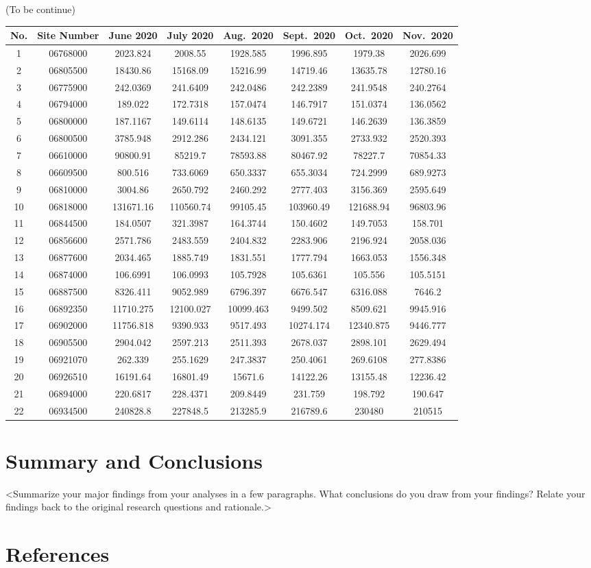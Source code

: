\documentclass[12pt,]{article}
\begin{document}
(To be continue)

\begin{longtable}[]{@{}cccccccc@{}}
\toprule
No. & Site Number & June 2020 & July 2020 & Aug.~2020 & Sept.~2020 &
Oct.~2020 & Nov.~2020\tabularnewline
\midrule
\endhead
1 & 06768000 & 2023.824 & 2008.55 & 1928.585 & 1996.895 & 1979.38 &
2026.699\tabularnewline
2 & 06805500 & 18430.86 & 15168.09 & 15216.99 & 14719.46 & 13635.78 &
12780.16\tabularnewline
3 & 06775900 & 242.0369 & 241.6409 & 242.0486 & 242.2389 & 241.9548 &
240.2764\tabularnewline
4 & 06794000 & 189.022 & 172.7318 & 157.0474 & 146.7917 & 151.0374 &
136.0562\tabularnewline
5 & 06800000 & 187.1167 & 149.6114 & 148.6135 & 149.6721 & 146.2639 &
136.3859\tabularnewline
6 & 06800500 & 3785.948 & 2912.286 & 2434.121 & 3091.355 & 2733.932 &
2520.393\tabularnewline
7 & 06610000 & 90800.91 & 85219.7 & 78593.88 & 80467.92 & 78227.7 &
70854.33\tabularnewline
8 & 06609500 & 800.516 & 733.6069 & 650.3337 & 655.3034 & 724.2999 &
689.9273\tabularnewline
9 & 06810000 & 3004.86 & 2650.792 & 2460.292 & 2777.403 & 3156.369 &
2595.649\tabularnewline
10 & 06818000 & 131671.16 & 110560.74 & 99105.45 & 103960.49 & 121688.94
& 96803.96\tabularnewline
11 & 06844500 & 184.0507 & 321.3987 & 164.3744 & 150.4602 & 149.7053 &
158.701\tabularnewline
12 & 06856600 & 2571.786 & 2483.559 & 2404.832 & 2283.906 & 2196.924 &
2058.036\tabularnewline
13 & 06877600 & 2034.465 & 1885.749 & 1831.551 & 1777.794 & 1663.053 &
1556.348\tabularnewline
14 & 06874000 & 106.6991 & 106.0993 & 105.7928 & 105.6361 & 105.556 &
105.5151\tabularnewline
15 & 06887500 & 8326.411 & 9052.989 & 6796.397 & 6676.547 & 6316.088 &
7646.2\tabularnewline
16 & 06892350 & 11710.275 & 12100.027 & 10099.463 & 9499.502 & 8509.621
& 9945.916\tabularnewline
17 & 06902000 & 11756.818 & 9390.933 & 9517.493 & 10274.174 & 12340.875
& 9446.777\tabularnewline
18 & 06905500 & 2904.042 & 2597.213 & 2511.393 & 2678.037 & 2898.101 &
2629.494\tabularnewline
19 & 06921070 & 262.339 & 255.1629 & 247.3837 & 250.4061 & 269.6108 &
277.8386\tabularnewline
20 & 06926510 & 16191.64 & 16801.49 & 15671.6 & 14122.26 & 13155.48 &
12236.42\tabularnewline
21 & 06894000 & 220.6817 & 228.4371 & 209.8449 & 231.759 & 198.792 &
190.647\tabularnewline
22 & 06934500 & 240828.8 & 227848.5 & 213285.9 & 216789.6 & 230480 &
210515\tabularnewline
\bottomrule
\end{longtable}

\newpage

\hypertarget{summary-and-conclusions}{%
\section{Summary and Conclusions}\label{summary-and-conclusions}}

\textless{}Summarize your major findings from your analyses in a few
paragraphs. What conclusions do you draw from your findings? Relate your
findings back to the original research questions and
rationale.\textgreater{}

\newpage

\hypertarget{references}{%
\section{References}\label{references}}
\end{document}
